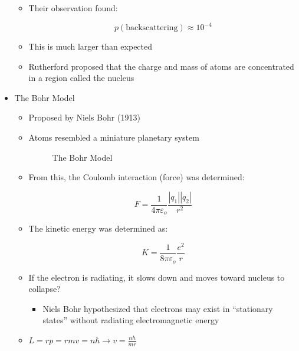 \begin{itemize}
    \begin{itemize}

      \item Their observation found:

        $$p(\text{backscattering})\approx 10^{-4}$$

      \item This is much larger than expected

      \item Rutherford proposed that the charge and mass of atoms are concentrated in a region called the nucleus

    \end{itemize}

  \item The Bohr Model

    \begin{itemize}

      \item Proposed by Niels Bohr (1913)

      \item Atoms resembled a miniature planetary system

        \begin{figure}[h!]
          \centering
          
          \caption{The Bohr Model}
          \label{fig:2}
        \end{figure}

      \item From this, the Coulomb interaction (force) was determined:

        $$\boxed{F=\frac{1}{4\pi\varepsilon_o}\frac{|q_1||q_2|}{r^2}}$$

      \item The kinetic energy was determined as:

        $$\boxed{K=\frac{1}{8\pi\varepsilon_o}\frac{e^2}{r}}$$

      \item If the electron is radiating, it slows down and moves toward nucleus to collapse?

        \begin{itemize}

          \item Niels Bohr hypothesized that electrons may exist in ``stationary states'' without radiating electromagnetic energy

        \end{itemize}

      \item $L = rp = rmv = n\hbar \rightarrow v = \frac{n\hbar}{mr}$


\end{itemize}
\end{itemize}
